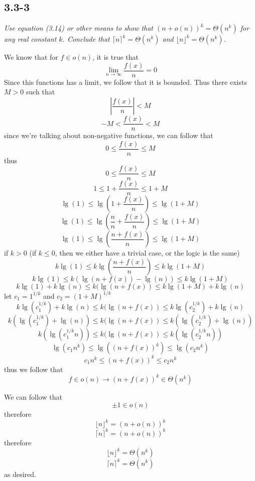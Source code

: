 \documentclass[11pt,oneside,titlepage]{book}
\begin{document}
\subsection*{3.3-3}

\textit{Use equation (3.14) or other means to show that $(n + o(n))^k = \Theta(n^k)$ for
  any real constant $k$. Conclude that $\lceil n \rceil^k = \Theta(n^k)$ and
  $\lfloor n \rfloor^k = \Theta(n^k)$.}




We know that for $f \in o(n)$, it is true that 
$$\lim_{n \to \infty}{\frac{f(x)}{n}} = 0$$
Since this functions has a limit, we follow that it is bounded. Thus there exists $M > 0$
such that
$$|\frac{f(x)}{n}| < M$$
$$-M < \frac{f(x)}{n} < M$$
since we're talking about non-negative functions, we can follow that
$$0 \leq \frac{f(x)}{n} \leq M$$
thus
$$0 \leq \frac{f(x)}{n} \leq M$$
$$1 \leq 1 + \frac{f(x)}{n} \leq 1 +  M$$
$$\lg(1) \leq \lg(1 + \frac{f(x)}{n}) \leq \lg(1 +  M)$$
$$\lg(1) \leq \lg(\frac{n}{n} + \frac{f(x)}{n}) \leq \lg(1 +  M)$$
$$\lg(1) \leq \lg(\frac{n + f(x)}{n}) \leq \lg(1 +  M)$$
if $k > 0$ (if $k \leq 0$, then we either have a trivial case, or the logic is the same)
$$k \lg(1) \leq k \lg(\frac{n + f(x)}{n}) \leq k \lg(1 +  M)$$
$$k \lg(1) \leq k (\lg(n + f(x)) - \lg(n)) \leq k \lg(1 +  M)$$
$$k \lg(1)  + k \lg(n) \leq k (\lg(n + f(x))  \leq k \lg(1 +  M) + k \lg(n)$$
let $c_1 = 1^{1/k}$ and $c_2 = (1 +  M)^{1/k}$
$$k \lg(c_1^{1/k})   + k \lg(n) \leq k (\lg(n + f(x))  \leq k \lg(c_2^{1/k}) + k \lg(n)$$
$$k (\lg(c_1^{1/k})   +  \lg(n)) \leq k (\lg(n + f(x))  \leq k (\lg(c_2^{1/k}) + \lg(n))$$
$$k (\lg(c_1^{1/k}n)) \leq k (\lg(n + f(x))  \leq k (\lg(c_2^{1/k}n))$$
$$\lg(c_1n^k) \leq \lg((n + f(x))^k)  \leq \lg(c_2n^k)$$
$$c_1n^k \leq (n + f(x))^k  \leq c_2n^k$$
thus we follow that
$$f \in o(n) \to (n + f(x))^k \in \Theta(n^k)$$

We can follow that
$$ \pm 1 \in o(n)$$
therefore 
$$\lfloor n \rfloor^k  = (n + o(n))^k$$
$$\lceil n \rceil^k  = (n + o(n))^k$$
therefore
$$\lfloor n \rfloor^k = \Theta(n^k)$$
$$\lceil n \rceil^k  = \Theta(n^k)$$
as desired.
\end{document}
